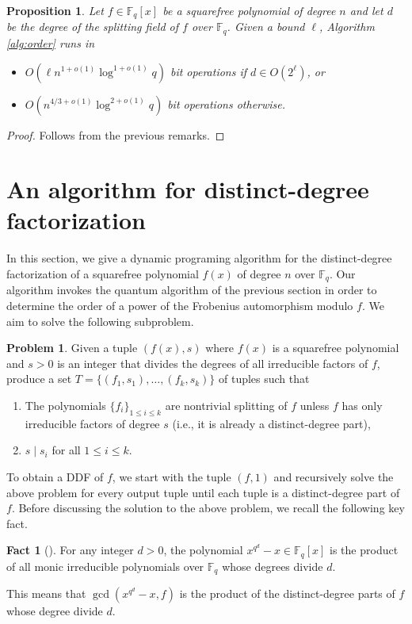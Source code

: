 \documentclass[11pt]{article}
\theoremstyle{plain}
\newtheorem{proposition}[theorem]{Proposition}
\theoremstyle{definition}
\newtheorem*{problem}{Problem}
\newtheorem*{fact}{Fact}
\def\F{\ensuremath{\mathbb{F}}}
\begin{document}
\begin{proposition}
	\label{prop:exact-d}
	Let $f \in \F_q[x]$ be a squarefree polynomial of degree $n$ and let $d$ be the degree of the 
	splitting field of $f$ over $\F_q$. Given a bound $\ell$, Algorithm \ref{alg:order} runs in
	\begin{itemize}
		\item $O(\ell n^{1 + o(1)}\log^{1 + o(1)}q)$ bit operations if $d \in O(2^\ell)$, or
		\item $O(n^{4 / 3 + o(1)}\log^{2 + o(1)}q)$ bit operations otherwise.
	\end{itemize}
\end{proposition}
\begin{proof}
	Follows from the previous remarks.
\end{proof}



\section{An algorithm for distinct-degree factorization}

In this section, we give a dynamic programing algorithm for the distinct-degree factorization of a 
squarefree polynomial $f(x)$ of degree $n$ over $\F_q$. Our algorithm invokes the quantum algorithm 
of the previous section in order to determine the order of a power of the Frobenius automorphism 
modulo $f$. We aim to solve the following subproblem.
\begin{problem}
	Given a tuple $(f(x), s)$ where $f(x)$ is a squarefree polynomial and $s > 0$ is an integer 
	that divides the degrees of all irreducible factors of $f$, produce a set $T = \{ (f_1, s_1), 
	\dots, (f_k, s_k) \}$ of tuples such that 
	\begin{enumerate}
		\item\label{cond:split} The polynomials $\{ f_i \}_{1 \le i \le k}$ are nontrivial 
		splitting of $f$ unless $f$ has only irreducible factors of degree $s$ (i.e., it is already 
		a distinct-degree part),
		\item\label{cond:div} $s \mid s_i$ for all $1 \le i \le k$.
	\end{enumerate}
\end{problem}
To obtain a DDF of $f$, we start with the tuple $(f, 1)$ and recursively solve the above problem 
for every output tuple until each tuple is a distinct-degree part of $f$. Before discussing the 
solution to the above problem, we recall the following key fact.
\begin{fact}[{\cite[Theorem 3.5]{lidl1997finite}}]
	For any integer $d > 0$, the polynomial $x^{q^d} - x \in \F_q[x]$ is the product of all monic 
	irreducible polynomials over $\F_q$ whose degrees divide $d$. 
\end{fact}
This means that $\gcd(x^{q^d} - x, f)$ is the product of the distinct-degree parts of $f$ whose 
degree divide $d$.
\end{document}
